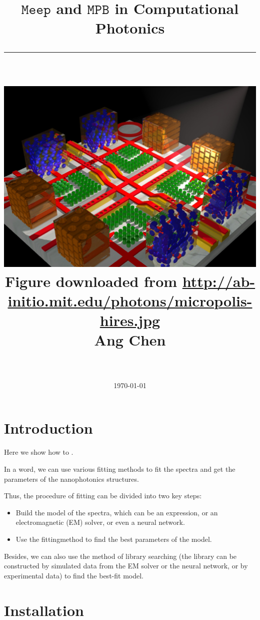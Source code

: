 \documentclass[a4paper,10pt]{article}
\title{\huge
$\texttt{Meep}$ and $\texttt{MPB}$ in Computational Photonics \\
\vspace{0.5cm}
\rule{\linewidth}{0.1mm} \\
\vspace{2.0cm}
\includegraphics[scale=1.35]{photonic_micropolis_logo.pdf} \\
\vspace{1.5cm}
\small Figure downloaded from \url{http://ab-initio.mit.edu/photons/micropolis-hires.jpg} \\
\vspace{2.0cm}
\LARGE Ang Chen\bigskip}
\author{\color{magenta}\email{\href{mailto:chenang@outlook.com}{\LARGE\texttt{chenang@outlook.com}}}\\ 
\medskip}
\date{\LARGE\today}
\renewenvironment{abstract}{%
    \large %
    \begin{center}%
        \bfseries \Large Abstract %
        \vspace{-.5em}%
        \vspace{15pt}%
    \end{center}%
    \list{}{%
        \setlength{\leftmargin}{0mm}%
        \setlength{\rightmargin}{\leftmargin}%
    }%
    \item\relax%
}{
    \endlist
}
\begin{document}
    
\maketitle
\thispagestyle{empty}

\newpage
{} 
\tableofcontents




\newpage


\section{Introduction}\label{introduction}

Here we show how to .

In a word, we can use various fitting methods to fit the spectra and get
the parameters of the nanophotonics structures.

Thus, the procedure of fitting can be divided into two key steps: 
\begin{itemize}[leftmargin=*]
\item Build the model of the spectra, which can be an expression, or an
electromagnetic (EM) solver, or even a neural network. 
\item Use the fittingmethod to find the best parameters of the model.
\end{itemize}

Besides, we can also use the method of library searching (the library
can be constructed by simulated data from the EM solver or the neural
network, or by experimental data) to find the best-fit model.

\section{Installation}\label{import-libraries}
\end{document}

